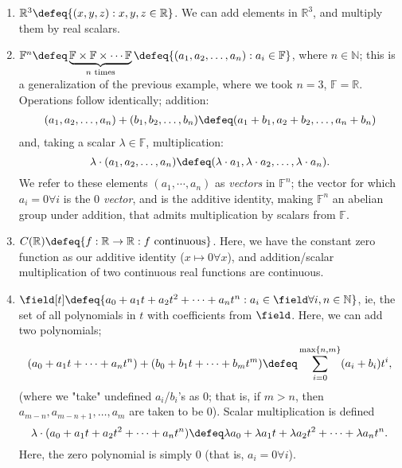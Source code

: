 \begin{example}
    \begin{enumerate}
        \item $\mathbb{R}^3 \defeq \{(x, y, z) : x, y, z \in \mathbb{R}\}$. We can add elements in $\mathbb{R}^3$, and multiply them by real scalars.
        \item  $\mathbb{F}^n \defeq \underbrace{\mathbb{F} \times \mathbb{F} \times \cdots \mathbb{F}}_{n \text{ times}} \defeq \{(a_1, a_2, \dots, a_n) : a_i \in \mathbb{F}\}$, where $n \in \mathbb{N}$\footnotemark; this is a generalization of the previous example, where we took $n = 3$, $\mathbb{F} = \mathbb{R}$. Operations follow identically; addition:
        \begin{align*}
            (a_1, a_2, \dots, a_n) + (b_1, b_2, \dots, b_n) \defeq (a_1 + b_1, a_2 + b_2, \dots, a_n + b_n)
        \end{align*}
        and, taking a scalar $\lambda \in \mathbb{F}$, multiplication:
        \[
            \lambda \cdot (a_1, a_2, \dots, a_n) \defeq (\lambda \cdot a_1, \lambda \cdot a_2, \dots, \lambda \cdot a_n).
            \]
        We refer to these elements $(a_1, \cdots, a_n)$ as \emph{vectors} in $\mathbb{F}^n$; the vector for which $a_i = 0 \forall i$ is the \emph{$0$ vector}, and is the additive identity, making $\mathbb{F}^n$ an abelian group under addition, that admits multiplication by scalars from $\mathbb{F}$.
        \item $C(\mathbb{R}) \defeq \{f : \mathbb{R} \to \mathbb{R} : f \text{ continuous}\}$. Here, we have the constant zero function as our additive identity ($x \mapsto 0 \forall x$), and addition/scalar multiplication of two continuous real functions are continuous.
        \item $\field[t] \defeq \{a_0 + a_1 t + a_2 t^2 + \cdots + a_n t^n: a_i \in \field \forall i, n \in \mathbb{N}\}$, ie, the set of all polynomials in $t$ with coefficients from $\field$. Here, we can add two polynomials; \[
            (a_0 + a_1 t + \cdots + a_n t^n) + (b_0 + b_1 t + \cdots + b_m t^m) \defeq \sum_{i=0}^{\max \{n, m\}}(a_i + b_i)t^i,
        \]
        (where we "take" undefined $a_i$/$b_i$'s as 0; that is, if $m > n$, then $a_{m - n}, a_{m - n + 1}, \dots, a_m$ are taken to be $0$). Scalar multiplication is defined \[
        \lambda \cdot (a_0 + a_1 t + a_2 t^2 + \cdots + a_n t^n) \defeq \lambda a_0 + \lambda a_1 t + \lambda a_2 t^2 + \cdots + \lambda a_n t^n.
        \]
        Here, the zero polynomial is simply $0$ (that is, $a_i = 0 \forall i$).
    \end{enumerate}
\end{example}

